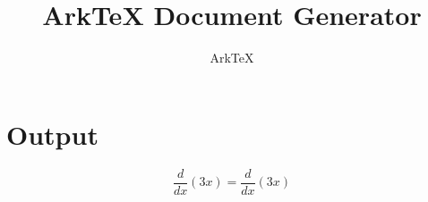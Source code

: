 \documentclass[dvips, 12pt, twoside]{article}
\begin{document}
\title{ArkTeX Document Generator}
\author{ArkTeX}
\maketitle

\medskip

\section*{Output}
\begin{LARGE}$$\frac{d}{dx}(3x)=\frac{d}{dx}(3x)$$\end{LARGE}
\end{document}
